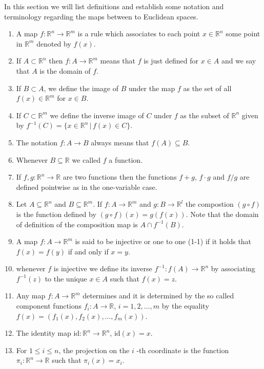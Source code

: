 \documentclass{amsart}
\begin{document}
In this section we will list definitions and establish some notation and terminology regarding the maps between to Euclidean spaces.

\begin{enumerate}
\item A map \(f : \mathbb{R}^n \to \mathbb{R}^m\) is a rule which associates to each point  \(x\in \mathbb{R}^n\) some point in \(\mathbb{R}^m\)  denoted by \(f(x)\).

\item If \(A\subset \mathbb{R}^n\) then \(f : A \to \mathbb{R}^m\) means that \(f\) is just defined for \(x\in A\) and we say that \(A\) is the domain of \(f\).

\item If \(B \subset A\), we define the image of \(B\) under the map \(f\) as the set of all \(f(x)\in\mathbb{R}^m\) for \(x\in B\).

\item If \(C \subset \mathbb{R}^m\) we define the inverse image of \(C\) under \(f\) as the subset of \(\mathbb{R}^n\) given by \(f^{-1}(C) = \{ x\in \mathbb{R}^n \,|\, f(x) \in C\}\).

\item The notation \(f:A\to B\) always means that \(f(A)\subseteq B\).

\item Whenever  \(B\subseteq \mathbb{R}\) we called \(f\) a function.

\item If \(f,g:\mathbb{R}^n \to \mathbb{R}\) are two functions then the functions \(f + g\), \(f\cdot g\) and \(f/g\) are defined pointwise as in the one-variable case.

\item Let \(A\subseteq \mathbb{R}^n\) and \(B\subseteq\mathbb{R}^m\). If \(f:A\to \mathbb{R}^m\) and \(g: B\to \mathbb{R}^l\) the compostion \((g \circ f)\) is the function defined by \((g\circ f)(x) = g(f(x))\). Note that the domain of definition of the composition map is \(A\cap f^{-1}(B)\).

\item A map \(f:A\to \mathbb{R}^m\) is said to be injective or one to one (1-1) if it holds that \(f(x) = f(y)\) if and only if \(x = y\).

\item whenever \(f\) is injective we define its inverse \(f^{-1}: f(A) \to \mathbb{R}^n\) by associating \(f^{-1}(z)\) to the unique \(x\in A\) such that \(f(x)=z\).

\item Any map \(f:A \to \mathbb{R}^m\) determines and it is determined by the so called component functions \(f_i:A\to \mathbb{R}\), \(i=1,2,\ldots,m\) by the equality \(f(x) = (f_1(x),f_2(x),\ldots, f_m(x))\).

\item The identity map \(\mbox{id}:\mathbb{R}^n\to \mathbb{R}^n\), \(\mbox{id}(x) = x\).

\item For \(1\leq i \leq n\), the projection on the \(i\) -th coordinate is the function \(\pi_i: \mathbb{R}^n \to \mathbb{R}\) such that \(\pi_i(x) = x_i\).
\end{enumerate}
\end{document}
